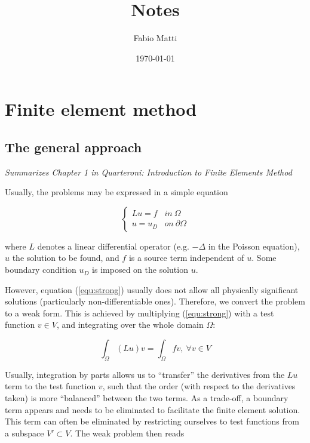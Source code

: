 \documentclass[11pt, a4paper]{article}
\title{Notes}
\author{Fabio Matti}
\date{\today}
\begin{document}
\maketitle

\section{Finite element method}
\label{sec:fem}

\subsection{The general approach}
\label{subsec:theory}

\textit{Summarizes Chapter 1 in Quarteroni: Introduction to Finite Elements Method}

Usually, the problems may be expressed in a simple equation 

\begin{equation}
    \begin{cases}
        L u = f & in~\Omega \\
        u = u_D & on~\partial \Omega
    \end{cases}
    \label{equ:strong}
\end{equation}

where $L$ denotes a linear differential operator (e.g. $-\Delta$ in the Poisson
equation), $u$ the solution to be found, and $f$ is a source term independent
of $u$. Some boundary condition $u_D$ is imposed on the solution $u$.

However, equation (\ref{equ:strong}) usually does not allow all physically
significant solutions (particularly non-differentiable ones). Therefore, we convert 
the problem to a weak form. This is achieved by multiplying (\ref{equ:strong}) with 
a test function $v \in V$, and integrating over the whole domain $\Omega$:

\begin{equation}
    \int_{\Omega} (L u) v = \int_{\Omega} f v, ~\forall v \in V \label{equ:initialweak}
\end{equation}

Usually, integration by parts allows us to \enquote{transfer} the derivatives from 
the $L u$ term to the test function $v$, such that the order (with respect to 
the derivatives taken) is more \enquote{balanced} between the two terms. As a
trade-off, a boundary term appears and needs to be eliminated to facilitate the 
finite element solution. This term can often be eliminated by restricting ourselves
to test functions from a subspace $V' \subset V$. The weak problem then reads
\end{document}
